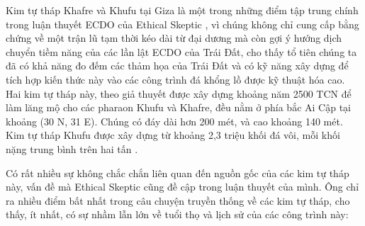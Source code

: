 \documentclass[10pt,twocolumn,letterpaper]{article}
\begin{document}
Kim tự tháp Khafre và Khufu tại Giza là một trong những điểm tập trung chính trong luận thuyết ECDO của Ethical Skeptic \cite{27}, vì chúng không chỉ cung cấp bằng chứng về một trận lũ tạm thời kéo dài từ đại dương mà còn gợi ý hướng dịch chuyển tiềm năng của các lần lật ECDO của Trái Đất, cho thấy tổ tiên chúng ta đã có khả năng đo đếm các thảm họa của Trái Đất và có kỹ năng xây dựng để tích hợp kiến thức này vào các công trình đá khổng lồ được kỹ thuật hóa cao. Hai kim tự tháp này, theo giả thuyết được xây dựng khoảng năm 2500 TCN để làm lăng mộ cho các pharaon Khufu và Khafre, đều nằm ở phía bắc Ai Cập tại khoảng (30 N, 31 E). Chúng có đáy dài hơn 200 mét, và cao khoảng 140 mét. Kim tự tháp Khufu được xây dựng từ khoảng 2,3 triệu khối đá vôi, mỗi khối nặng trung bình trên hai tấn \cite{24, 25}.

Có rất nhiều sự không chắc chắn liên quan đến nguồn gốc của các kim tự tháp này, vấn đề mà Ethical Skeptic cũng đề cập trong luận thuyết của mình. Ông chỉ ra nhiều điểm bất nhất trong câu chuyện truyền thống về các kim tự tháp, cho thấy, ít nhất, có sự nhầm lẫn lớn về tuổi thọ và lịch sử của các công trình này:
\end{document}

